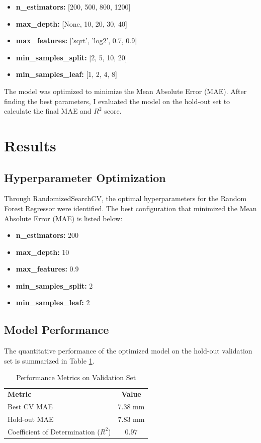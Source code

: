 \documentclass{IEEEtran}
\begin{document}
\begin{itemize}
    \item \textbf{n\_estimators:} [200, 500, 800, 1200]
    \item \textbf{max\_depth:} [None, 10, 20, 30, 40]
    \item \textbf{max\_features:} ['sqrt', 'log2', 0.7, 0.9]
    \item \textbf{min\_samples\_split:} [2, 5, 10, 20]
    \item \textbf{min\_samples\_leaf:} [1, 2, 4, 8]
\end{itemize}

The model was optimized to minimize the Mean Absolute Error (MAE). After finding the best parameters, I evaluated the model on the hold-out set to calculate the final MAE and $R^2$ score.
\section{Results}

\subsection{Hyperparameter Optimization}
Through RandomizedSearchCV, the optimal hyperparameters for the Random Forest Regressor were identified. The best configuration that minimized the Mean Absolute Error (MAE) is listed below:
\begin{itemize}
    \item \textbf{n\_estimators:} 200
    \item \textbf{max\_depth:} 10
    \item \textbf{max\_features:} 0.9
    \item \textbf{min\_samples\_split:} 2
    \item \textbf{min\_samples\_leaf:} 2
\end{itemize}

\subsection{Model Performance}
The quantitative performance of the optimized model on the hold-out validation set is summarized in Table \ref{tab:results}.

\begin{table}[htbp]
    \centering
    \caption{Performance Metrics on Validation Set}
    \label{tab:results}
    \begin{tabular}{lc}
        \textbf{Metric} & \textbf{Value} \\
        Best CV MAE & 7.38 mm \\
        Hold-out MAE & 7.83 mm \\
        Coefficient of Determination ($R^2$) & 0.97 \\
    \end{tabular}
\end{table}
\end{document}
